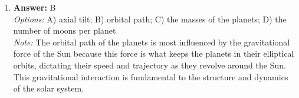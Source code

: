 \documentclass[12pt]{article}
\begin{document}
\begin{enumerate}[label=\arabic*.]
\\ \textit{Note:} The correct answer is based on the principle that an increase in temperature causes particles, including those in a copper wire, to move more rapidly due to increased thermal energy, leading to heightened kinetic energy and motion among the copper particles. This heightened motion is what manifests as a temperature increase in the material.
\item \textbf{Answer:} B
\\ \textit{Options:} A) axial tilt; B) orbital path; C) the masses of the planets; D) the number of moons per planet
\\ \textit{Note:} The orbital path of the planets is most influenced by the gravitational force of the Sun because this force is what keeps the planets in their elliptical orbits, dictating their speed and trajectory as they revolve around the Sun. This gravitational interaction is fundamental to the structure and dynamics of the solar system.
\end{enumerate}
\end{document}
